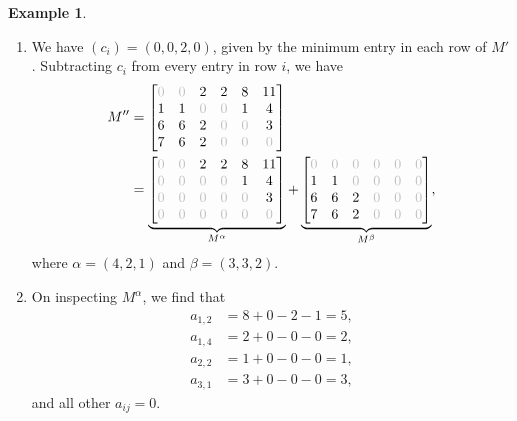 \documentclass[noamsfonts,10pt]{amsart}
\newcommand{\al}{\alpha}
\newcommand{\be}{\beta}
\newcommand{\gz}{\textcolor{lightgray}{0}}
\newcommand{\1}{\mathbf{1}}
\theoremstyle{plain}
\theoremstyle{definition}
\newtheorem{example}[theorem]{Example}
\numberwithin{equation}{section}
\begin{document}
\begin{example}
\begin{enumerate}
        \item We have $(c_i) = (0,0,2,0)$, given by the minimum entry in each row of $M'$.
        Subtracting $c_i$ from every entry in row $i$, we have
        \begin{align*}
            M'' &= \begin{bmatrix}
                \gz & \gz & 2 & 2 & 8 & 11 \\
                1 & 1 & \gz & \gz & 1 & 4 \\
                6 & 6 & 2 & \gz & \gz & 3 \\
                7 & 6 & 2 & \gz & \gz & \gz
            \end{bmatrix} \\
            &= \underbrace{\begin{bmatrix}
                \gz & \gz & 2 & 2 & 8 & 11 \\
                \gz & \gz & \gz & \gz & 1 & 4 \\
                \gz & \gz & \gz & \gz & \gz & 3 \\
                \gz & \gz & \gz & \gz & \gz & \gz
            \end{bmatrix}}_{M^\al} + 
            \underbrace{\begin{bmatrix}
                \gz & \gz & \gz & \gz & \gz & \gz \\
                1 & 1 & \gz & \gz & \gz & \gz \\
                6 & 6 & 2 & \gz & \gz & \gz \\
                7 & 6 & 2 & \gz & \gz & \gz
            \end{bmatrix}}_{M^\be},
        \end{align*}
        where $\al = (4,2,1)$ and $\be = (3,3,2)$.

        \item On inspecting $M^\al$, we find that
        \begin{align*}
        a_{1,2} &= 8+0-2-1 = 5, \\
        a_{1,4} &= 2 + 0 - 0 - 0 = 2, \\ a_{2,2} &= 1 + 0 - 0 - 0 = 1, \\
        a_{3,1} &= 3 + 0 - 0 - 0 = 3,
        \end{align*}
        and all other $a_{ij} = 0$.


\end{enumerate}
\end{example}
\end{document}
